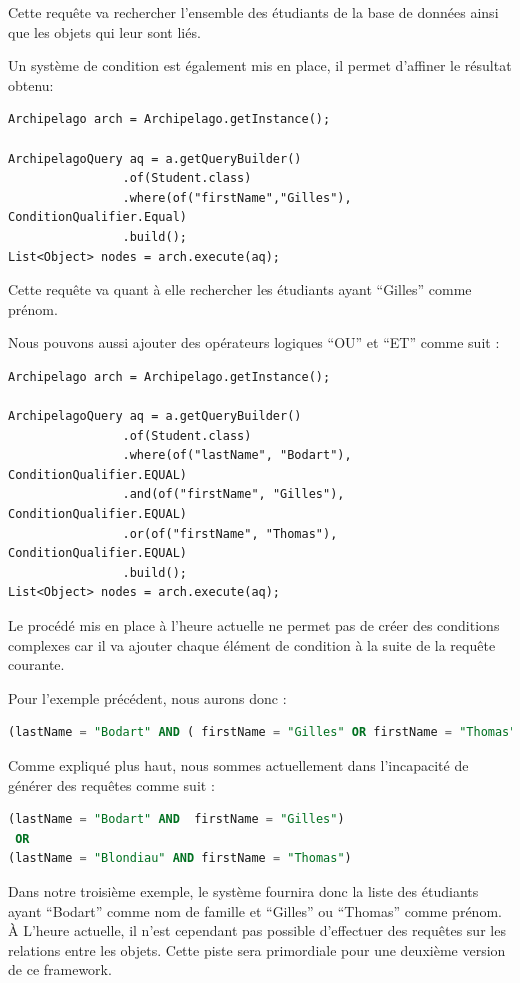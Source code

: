 \documentclass[a4paper,fleqn,12pt]{report}
\begin{document}
Cette requête va rechercher l'ensemble des étudiants de la base de données ainsi que les objets qui leur sont liés.

Un système de condition est également mis en place, il permet d'affiner le résultat obtenu: 

\begin{lstlisting}
Archipelago arch = Archipelago.getInstance();

ArchipelagoQuery aq = a.getQueryBuilder()
                .of(Student.class)
                .where(of("firstName","Gilles"), ConditionQualifier.Equal)
                .build();
List<Object> nodes = arch.execute(aq);
\end{lstlisting}

Cette requête va quant à elle rechercher les étudiants ayant \enquote{Gilles} comme prénom.

Nous pouvons aussi ajouter des opérateurs logiques \enquote{OU} et \enquote{ET} comme suit :
\begin{lstlisting}
Archipelago arch = Archipelago.getInstance();

ArchipelagoQuery aq = a.getQueryBuilder()
                .of(Student.class)
                .where(of("lastName", "Bodart"), ConditionQualifier.EQUAL)
                .and(of("firstName", "Gilles"), ConditionQualifier.EQUAL)
                .or(of("firstName", "Thomas"), ConditionQualifier.EQUAL)
                .build();
List<Object> nodes = arch.execute(aq);
\end{lstlisting}

Le procédé mis en place à l'heure actuelle ne permet pas de créer des conditions complexes car il va ajouter chaque élément de condition à la suite de la requête courante. 

Pour l'exemple précédent, nous aurons donc : 

\begin{lstlisting}[language=SQL]
(lastName = "Bodart" AND ( firstName = "Gilles" OR firstName = "Thomas"))
\end{lstlisting}

Comme expliqué plus haut, nous sommes actuellement dans l'incapacité de générer des requêtes comme suit :

\begin{lstlisting}[language=SQL]
(lastName = "Bodart" AND  firstName = "Gilles") 
 OR 
(lastName = "Blondiau" AND firstName = "Thomas")
\end{lstlisting}
\label{badCondition}
Dans notre troisième exemple, le système fournira donc la liste des étudiants ayant \enquote{Bodart} comme nom de famille et \enquote{Gilles} ou \enquote{Thomas} comme prénom. \`A L'heure actuelle, il n'est cependant pas possible d'effectuer des requêtes sur les relations entre les objets. Cette piste sera primordiale pour une deuxième version de ce framework.
\end{document}
